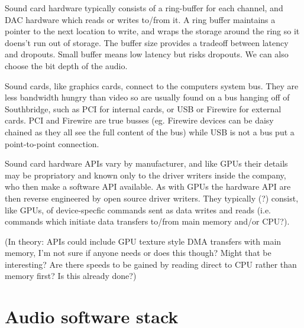 \documentclass[oneside,english]{scrbook}
\begin{document}
Sound card hardware typically consists of a ring-buffer for each channel, and DAC hardware which reads or writes to/from it. A ring buffer maintains a pointer to the next location to write, and wraps the storage around the ring so it doens't run out of storage. The buffer size provides a tradeoff between latency and dropouts. Small buffer means low latency but risks dropouts.  We can also choose the bit depth of the audio.

Sound cards, like graphics cards, connect to the computers system bus. They are less bandwidth hungry than video so are usually found on a bus hanging off of Southbridge, such as PCI for internal cards, or USB or Firewire for external cards.  PCI and Firewire are true busses (eg. Firewire devices can be daisy chained as they all see the full content of the bus) while USB is not a bus put a point-to-point connection.

Sound card hardware APIs vary by manufacturer, and like GPUs their details may be propriatory and known only to the driver writers inside the company, who then make a software API available. As with GPUs the hardware API are then reverse engineered by open source driver writers.  They typically (?) consist, like GPUs, of device-specfic commands sent as data writes and reads (i.e. commands which initiate data transfers to/from main memory and/or CPU?).

(In theory: APIs could include GPU texture style DMA transfers with main memory, I'm not sure if anyone needs or does this though? Might that be interesting?  Are there speeds to be gained by reading direct to CPU rather than memory first? Is this already done?)

\chapter{Audio software stack}
\end{document}
